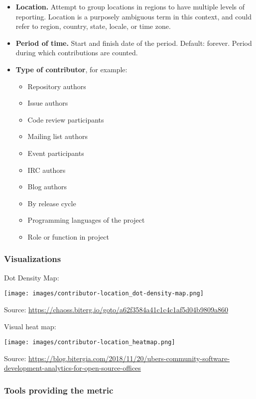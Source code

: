 \documentclass[
  12pt,
]{article}
\providecommand{\tightlist}{%
  \setlength{\itemsep}{0pt}\setlength{\parskip}{0pt}}
\begin{document}
\begin{itemize}
\tightlist
\item
  \textbf{Location.} Attempt to group locations in regions to have
  multiple levels of reporting. Location is a purposely ambiguous term
  in this context, and could refer to region, country, state, locale, or
  time zone.
\item
  \textbf{Period of time.} Start and finish date of the period. Default:
  forever. Period during which contributions are counted.
\item
  \textbf{Type of contributor}, for example:

  \begin{itemize}
  \tightlist
  \item
    Repository authors
  \item
    Issue authors
  \item
    Code review participants
  \item
    Mailing list authors
  \item
    Event participants
  \item
    IRC authors
  \item
    Blog authors
  \item
    By release cycle
  \item
    Programming languages of the project
  \item
    Role or function in project
  \end{itemize}
\end{itemize}

\hypertarget{visualizations-6}{%
\subsubsection{Visualizations}\label{visualizations-6}}

Dot Density Map:

\texttt{[image: images/contributor-location\_dot-density-map.png]}

Source:
\url{https://chaoss.biterg.io/goto/a62f3584a41c1c4c1af5d04b9809a860}

Visual heat map:

\texttt{[image: images/contributor-location\_heatmap.png]}

Source:
\url{https://blog.bitergia.com/2018/11/20/ubers-community-software-development-analytics-for-open-source-offices}

\hypertarget{tools-providing-the-metric-5}{%
\subsubsection{Tools providing the
metric}\label{tools-providing-the-metric-5}}
\end{document}
